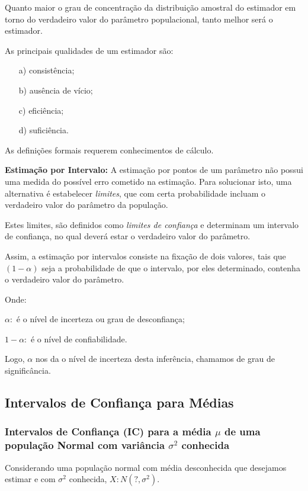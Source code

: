 \documentclass[oneside,a4paper,12pt]{article}
\begin{document}
Quanto maior o grau de concentração da distribuição amostral do estimador em torno do verdadeiro valor do parâmetro populacional, tanto melhor será o estimador.

As principais qualidades de um estimador são:
\begin{enumerate}
	\item [a)] consistência;
	\item [b)] ausência de vício;
	\item [c)] eficiência;
	\item [d)] suficiência.
\end{enumerate}

As definições formais requerem conhecimentos de cálculo.

{\bf Estimação por Intervalo:} A estimação por pontos de um parâmetro não possui uma medida do possível erro cometido na estimação. Para solucionar isto, uma alternativa é estabelecer \emph{limites}, que com certa probabilidade incluam  o verdadeiro valor do parâmetro da população.

Estes limites, são definidos como \emph{limites de confiança} e determinam um intervalo de confiança, no qual deverá estar o verdadeiro valor do parâmetro.

Assim, a estimação por intervalos consiste na fixação de dois valores, tais que $(1 - \alpha)$ seja a probabilidade de que o intervalo, por eles determinado, contenha o verdadeiro valor do parâmetro.

Onde:

$\alpha:$ é o nível de incerteza ou grau de desconfiança;

$1 - \alpha:$ é o nível de confiabilidade.

Logo, $\alpha$ nos da o nível de incerteza desta inferência, chamamos de grau de significância.

\subsection{Intervalos de Confiança para Médias}

\subsubsection{Intervalos de Confiança (IC) para a média $\mu$ de uma população Normal com variância $\sigma^2$ conhecida}

Considerando uma população normal com média desconhecida que desejamos estimar e com $\sigma^2$ conhecida, $X:N(?,\sigma^2)$.
\end{document}
